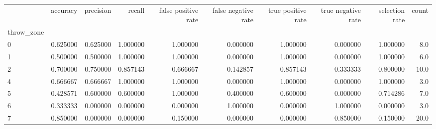 \begin{tabular}{lrrrrrrrrr}
\toprule
{} &  accuracy &  precision &    recall &  false positive rate &  false negative rate &  true positive rate &  true negative rate &  selection rate &  count \\
throw\_zone &           &            &           &                      &                      &                     &                     &                 &        \\
\midrule
0          &  0.625000 &   0.625000 &  1.000000 &             1.000000 &             0.000000 &            1.000000 &            0.000000 &        1.000000 &    8.0 \\
1          &  0.500000 &   0.500000 &  1.000000 &             1.000000 &             0.000000 &            1.000000 &            0.000000 &        1.000000 &    6.0 \\
2          &  0.700000 &   0.750000 &  0.857143 &             0.666667 &             0.142857 &            0.857143 &            0.333333 &        0.800000 &   10.0 \\
4          &  0.666667 &   0.666667 &  1.000000 &             1.000000 &             0.000000 &            1.000000 &            0.000000 &        1.000000 &    3.0 \\
5          &  0.428571 &   0.600000 &  0.600000 &             1.000000 &             0.400000 &            0.600000 &            0.000000 &        0.714286 &    7.0 \\
6          &  0.333333 &   0.000000 &  0.000000 &             0.000000 &             1.000000 &            0.000000 &            1.000000 &        0.000000 &    3.0 \\
7          &  0.850000 &   0.000000 &  0.000000 &             0.150000 &             0.000000 &            0.000000 &            0.850000 &        0.150000 &   20.0 \\
\bottomrule
\end{tabular}
